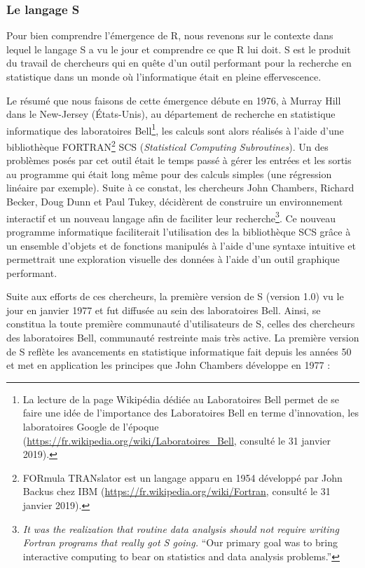 \documentclass[]{article}
\begin{document}
\hypertarget{le-langage-s}{%
\subsubsection{Le langage S}\label{le-langage-s}}

Pour bien comprendre l'émergence de R, nous revenons sur le contexte dans lequel le langage S a vu le jour et comprendre ce que R lui doit. S est le produit du travail de chercheurs qui
en quête d'un outil performant pour la recherche en statistique dans un monde où l'informatique était en pleine effervescence.

Le résumé que nous faisons de cette émergence débute en 1976, à Murray Hill dans
le New-Jersey (États-Unis), au département de recherche en statistique
informatique des laboratoires Bell\footnote{La lecture de la page Wikipédia dédiée au Laboratoires Bell permet de
  se faire une idée de l'importance des Laboratoires Bell en terme d'innovation,
  les laboratoires Google de l'époque (\url{https://fr.wikipedia.org/wiki/Laboratoires_Bell}, consulté le 31 janvier 2019).}, les calculs sont alors réalisés à
l'aide d'une bibliothèque FORTRAN\footnote{FORmula TRANslator est un langage apparu en 1954 développé par
  John Backus chez IBM (\url{https://fr.wikipedia.org/wiki/Fortran}, consulté le 31 janvier 2019).} SCS (\emph{Statistical Computing
Subroutines}). Un des problèmes posés par cet outil était le temps passé à gérer
les entrées et les sortis au programme qui était long même pour des calculs
simples (une régression linéaire par exemple). Suite à ce constat, les
chercheurs John Chambers, Richard Becker, Doug Dunn et Paul Tukey, décidèrent de
construire un environnement interactif et un nouveau langage afin de faciliter
leur recherche\footnote{\emph{It was the realization that routine data analysis should not require writing Fortran programs that really got S going.} \citep[ p.~2]{becker_s_1984} ``Our primary goal was to bring interactive computing to bear on statistics and data analysis problems.''}. Ce nouveau programme informatique faciliterait
l'utilisation des la bibliothèque SCS grâce à un ensemble d'objets et de
fonctions manipulés à l'aide d'une syntaxe intuitive et permettrait une
exploration visuelle des données à l'aide d'un outil graphique performant.

Suite aux efforts de ces chercheurs, la première version de S (version 1.0) vu le jour en janvier 1977 et fut diffusée au sein des laboratoires Bell. Ainsi, se
constitua la toute première communauté d'utilisateurs de S, celles des chercheurs des laboratoires Bell, communauté restreinte mais très active. La première version de S reflète les avancements en statistique informatique fait depuis les années 50 et met en application les principes que John Chambers développe en 1977 \citep{chambers_computational_1977} :
\end{document}
